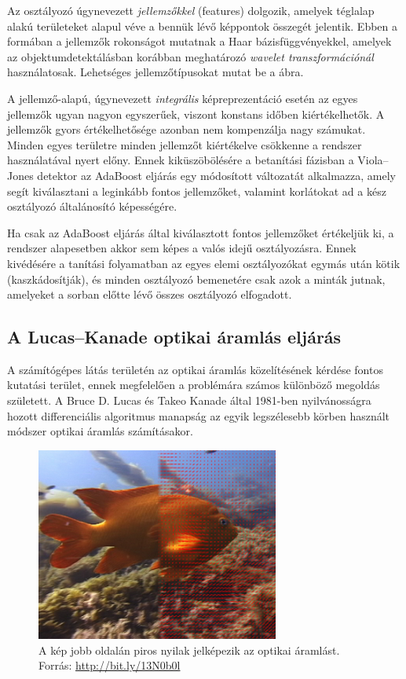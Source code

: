 Az osztályozó úgynevezett \emph{jellemzőkkel} (features) dolgozik, amelyek téglalap alakú területeket alapul véve a bennük lévő képpontok összegét jelentik. Ebben a formában a jellemzők rokonságot mutatnak a Haar bázisfüggvényekkel, amelyek az objektumdetektálásban korábban meghatározó \emph{wavelet transzformációnál} használatosak. Lehetséges jellemzőtípusokat mutat be a  ábra.

A jellemző-alapú, úgynevezett \emph{integrális} képreprezentáció esetén az egyes jellemzők ugyan nagyon egyszerűek, viszont konstans időben kiértékelhetők. A jellemzők gyors értékelhetősége azonban nem kompenzálja nagy számukat. Minden egyes területre minden jellemzőt kiértékelve csökkenne a rendszer használatával nyert előny. Ennek kiküszöbölésére a betanítási fázisban a Viola--Jones detektor az AdaBoost \cite{freund} eljárás egy módosított változatát alkalmazza, amely segít kiválasztani a leginkább fontos jellemzőket, valamint korlátokat ad a kész osztályozó általánosító képességére.

Ha csak az AdaBoost eljárás által kiválasztott fontos jellemzőket értékeljük ki, a rendszer alapesetben akkor sem képes a valós idejű osztályozásra. Ennek kivédésére a tanítási folyamatban az egyes elemi osztályozókat egymás után kötik (kaszkádosítják), és minden osztályozó bemenetére csak azok a minták jutnak, amelyeket a sorban előtte lévő összes osztályozó elfogadott.

\subsection{A Lucas--Kanade optikai áramlás eljárás}\label{sect:optflow}

A számítógépes látás területén az optikai áramlás közelítésének kérdése fontos kutatási terület, ennek megfelelően a problémára számos különböző megoldás született. A Bruce D. Lucas és Takeo Kanade által 1981-ben nyilvánosságra hozott \cite{lk} differenciális algoritmus manapság az egyik legszélesebb körben használt módszer optikai áramlás számításakor.

\begin{figure}[!ht]
\centering
\includegraphics[width=80mm, keepaspectratio]{figures/opticalflow.png}
\caption{A kép jobb oldalán piros nyilak jelképezik az optikai áramlást.\\Forrás: \url{http://bit.ly/13N0b0l}}
\label{fig:optical_flow}
\end{figure}

